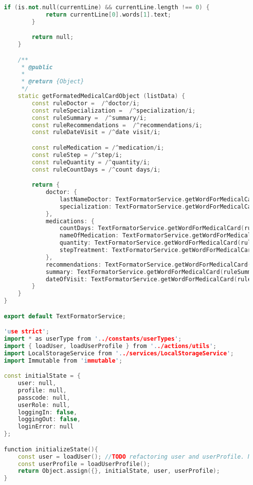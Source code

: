 \begin{lstlisting}[language=C++, style=cplusplusstyle]
        if (is.not.null(currentLine) && currentLine.length !== 0) {
            return currentLine[0].words[1].text;
        }

        return null;
    }

    /**
     * @public
     *
     * @return {Object}
     */
    static getFormatedMedicalCardObject (listData) {
        const ruleDoctor =  /^doctor/i;
        const ruleSpecialization =  /^specialization/i;
        const ruleSummary =  /^summary/i;
        const ruleRecommendations =  /^recommendations/i;
        const ruleDateVisit = /^date visit/i;

        const ruleMedication = /^medication/i;
        const ruleStep = /^step/i;
        const ruleQuantity = /^quantity/i;
        const ruleCountDays = /^count days/i;

        return {
            doctor: {
                lastNameDoctor: TextFormatorService.getWordForMedicalCard(ruleDoctor, listData),
                specialization: TextFormatorService.getWordForMedicalCard(ruleSpecialization, listData)
            },
            medications: {
                countDays: TextFormatorService.getWordForMedicalCard(ruleCountDays, listData),
                nameOfMedication: TextFormatorService.getWordForMedicalCard(ruleMedication, listData),
                quantity: TextFormatorService.getWordForMedicalCard(ruleQuantity, listData),
                stepTreatment: TextFormatorService.getWordForMedicalCard(ruleStep, listData)
            },
            recommendations: TextFormatorService.getWordForMedicalCard(ruleRecommendations, listData),
            summary: TextFormatorService.getWordForMedicalCard(ruleSummary, listData),
            dateOfVisit: TextFormatorService.getWordForMedicalCard(ruleDateVisit, listData)
        }
    }
}

export default TextFormatorService;

'use strict';
import * as userType from '../constants/userTypes';
import { loadUser, loadUserProfile } from '../actions/utils';
import LocalStorageService from '../services/LocalStorageService';
import Immutable from 'immutable';

const initialState = {
    user: null,
    profile: null,
    passcode: null,
    userRole: null,
    loggingIn: false,
    loggingOut: false,
    loginError: null
};

function initializeState(){
    const user = loadUser(); //TODO refactoring user and userProfile. Now copy-paste =(
    const userProfile = loadUserProfile();
    return Object.assign({}, initialState, user, userProfile);
}


\end{lstlisting}
